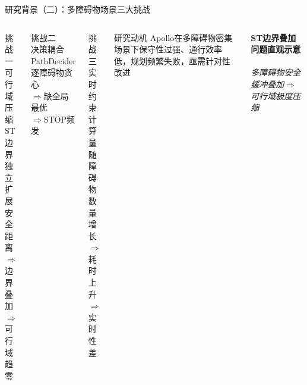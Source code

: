 \documentclass{beamer}
\begin{document}
\begin{frame}{研究背景（二）：多障碍物场景三大挑战}
  \begin{columns}[T]
    \begin{columns}[c]
      \begin{alertblock}{\centering 挑战一\\可行域压缩}
        \centering\small
        ST边界独立\\扩展安全距离\\$\Rightarrow$边界叠加\\$\Rightarrow$可行域趋零
      \end{alertblock}
      \begin{alertblock}{\centering 挑战二\\决策耦合}
        \centering\small
        PathDecider\\逐障碍物贪心\\$\Rightarrow$缺全局最优\\$\Rightarrow$STOP频发
      \end{alertblock}
      \begin{alertblock}{\centering 挑战三\\实时约束}
        \centering\small
        计算量随障碍\\物数量增长\\$\Rightarrow$耗时上升\\$\Rightarrow$实时性差
      \end{alertblock}
    \end{columns}
    \vspace{0.4em}
    \begin{block}{研究动机}
      \small Apollo在多障碍物密集场景下\alert{保守性过强、通行效率低}，规划频繁失败，亟需针对性改进
    \end{block}

    \centering
    {\small\textbf{ST边界叠加问题直观示意}}\\[3pt]
    \\[2pt]
    \footnotesize{\textit{多障碍物安全缓冲叠加$\Rightarrow$可行域极度压缩}}
  \end{columns}
\end{frame}
\end{document}
